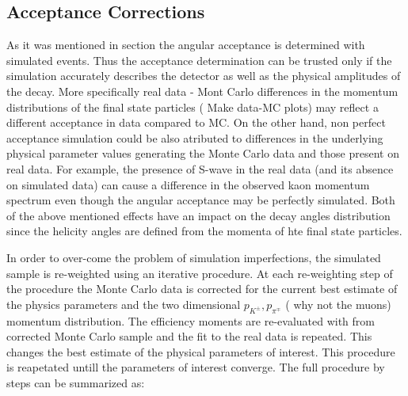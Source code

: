 \subsection{Acceptance Corrections}
\label{Accceptance_Corrections}
As it was mentioned in section  the angular acceptance is determined with simulated \BsJpsiKst events.
Thus the acceptance determination can be trusted only if the simulation accurately describes the detector as well as the 
physical amplitudes of the \BsJpsiKst decay. More specifically real data - Mont Carlo differences in the momentum distributions
of the final state particles (\figref{} {\color{red} Make data-MC plots}) may reflect a different acceptance in data compared to MC. On the other hand,
non perfect acceptance simulation could be also atributed to differences in the underlying physical parameter values generating 
the Monte Carlo data and those present on real data. For example, the presence of S-wave in the real data (and its absence on simulated data)
can cause a difference in the observed kaon momentum spectrum even though the angular acceptance may be perfectly simulated.
Both of the above mentioned effects have an impact on the decay angles distribution since the helicity angles are defined
from the momenta of hte final state particles. 

In order to over-come the problem of simulation imperfections, the simulated sample
is re-weighted using an iterative procedure. At each re-weighting step of the procedure the Monte Carlo data is corrected 
for the current best estimate of the physics parameters and the two dimensional $p_{K^{\pm}},p_{\pi^{\mp}}$ ({\color{red} why not the muons)} momentum distribution. 
The efficiency moments are re-evaluated with from corrected Monte Carlo sample and the fit to the real data is repeated. 
This changes the best estimate of the physical parameters of interest. This procedure is reapetated untill the parameters
of interest converge. The full procedure by steps can be summarized as:

